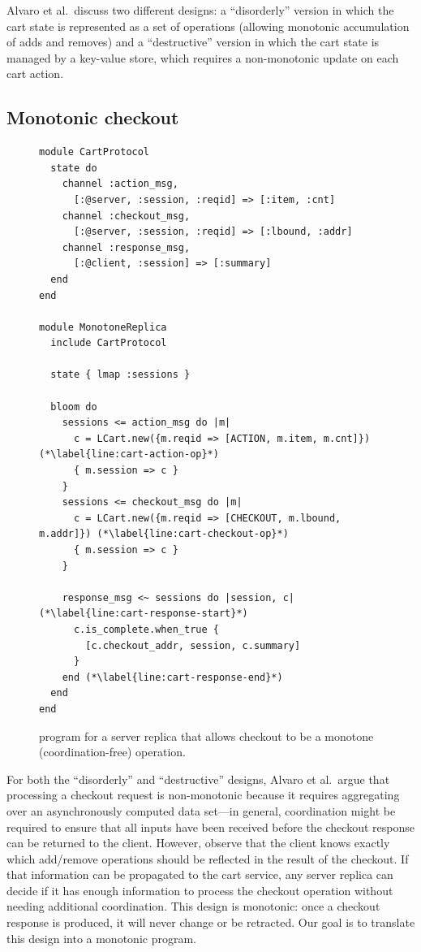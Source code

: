 Alvaro et al.\ discuss two different designs: a ``disorderly'' version in which
the cart state is represented as a set of operations (allowing monotonic
accumulation of adds and removes) and a ``destructive'' version in which the
cart state is managed by a key-value store, which requires a non-monotonic
update on each cart action.

\subsection{Monotonic checkout}
\label{sec:monotone-checkout}

\begin{figure}[t]
\begin{scriptsize}

\begin{lstlisting}
module CartProtocol
  state do
    channel :action_msg,
      [:@server, :session, :reqid] => [:item, :cnt]
    channel :checkout_msg,
      [:@server, :session, :reqid] => [:lbound, :addr]
    channel :response_msg,
      [:@client, :session] => [:summary]
  end
end

module MonotoneReplica
  include CartProtocol

  state { lmap :sessions }

  bloom do
    sessions <= action_msg do |m|
      c = LCart.new({m.reqid => [ACTION, m.item, m.cnt]}) (*\label{line:cart-action-op}*)
      { m.session => c }
    }
    sessions <= checkout_msg do |m|
      c = LCart.new({m.reqid => [CHECKOUT, m.lbound, m.addr]}) (*\label{line:cart-checkout-op}*)
      { m.session => c }
    }

    response_msg <~ sessions do |session, c| (*\label{line:cart-response-start}*)
      c.is_complete.when_true {
        [c.checkout_addr, session, c.summary]
      }
    end (*\label{line:cart-response-end}*)
  end
end
\end{lstlisting}
\end{scriptsize}
\caption{\lang program for a server replica that allows checkout to be a
  monotone (coordination-free) operation.}
\label{fig:monotone-cart}
\end{figure}

For both the ``disorderly'' and ``destructive'' designs, Alvaro et al.\ argue
that processing a checkout request is non-monotonic because it requires
aggregating over an asynchronously computed data set---in general, coordination
might be required to ensure that all inputs have been received before the
checkout response can be returned to the client. However, observe that the
client knows exactly which add/remove operations should be reflected in the
result of the checkout. If that information can be propagated to the cart
service, any server replica can decide if it has enough information to process
the checkout operation without needing additional coordination. This design is
monotonic: once a checkout response is produced, it will never change or be
retracted. Our goal is to translate this design into a monotonic \lang program.

